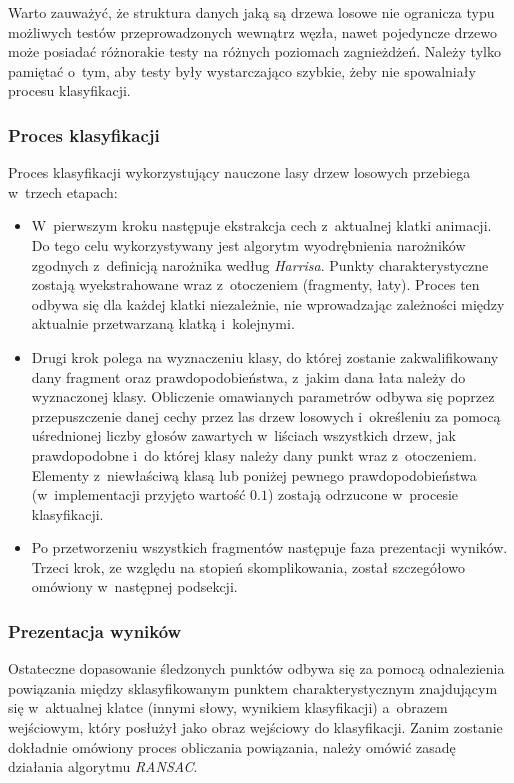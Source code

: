         Warto zauważyć, że struktura danych jaką są drzewa losowe nie ogranicza typu możliwych testów przeprowadzonych wewnątrz węzła, nawet pojedyncze drzewo może posiadać różnorakie testy na różnych poziomach zagnieżdżeń. Należy tylko pamiętać o~tym, aby testy były wystarczająco szybkie, żeby nie spowalniały procesu klasyfikacji.

      \subsubsection{Proces klasyfikacji}

        Proces klasyfikacji wykorzystujący nauczone lasy drzew losowych przebiega w~trzech etapach:
          \begin{itemize}
            \item W~pierwszym kroku następuje ekstrakcja cech z~aktualnej klatki animacji. Do tego celu wykorzystywany jest algorytm wyodrębnienia narożników zgodnych z~definicją narożnika według \textit{Harrisa}. Punkty charakterystyczne zostają wyekstrahowane wraz z~otoczeniem (fragmenty, łaty). Proces ten odbywa się dla każdej klatki niezależnie, nie wprowadzając zależności między aktualnie przetwarzaną klatką i~kolejnymi.
            \item Drugi krok polega na wyznaczeniu klasy, do której zostanie zakwalifikowany dany fragment oraz prawdopodobieństwa, z~jakim dana łata należy do wyznaczonej klasy. Obliczenie omawianych parametrów odbywa się poprzez przepuszczenie danej cechy przez las drzew losowych i~określeniu za pomocą uśrednionej liczby głosów zawartych w~liściach wszystkich drzew, jak prawdopodobne i~do której klasy należy dany punkt wraz z~otoczeniem. Elementy z~niewłaściwą klasą lub poniżej pewnego prawdopodobieństwa (w~implementacji przyjęto wartość $0.1$) zostają odrzucone w~procesie klasyfikacji.
            \item Po przetworzeniu wszystkich fragmentów następuje faza prezentacji wyników. Trzeci krok, ze względu na stopień skomplikowania, został szczegółowo omówiony w~następnej podsekcji.
          \end{itemize}

      \subsubsection{Prezentacja wyników}

        Ostateczne dopasowanie śledzonych punktów odbywa się za pomocą odnalezienia powiązania między sklasyfikowanym punktem charakterystycznym znajdującym się w~aktualnej klatce (innymi słowy, wynikiem klasyfikacji) a~obrazem wejściowym, który posłużył jako obraz wejściowy do klasyfikacji. Zanim zostanie dokładnie omówiony proces obliczania powiązania, należy omówić zasadę działania algorytmu \textit{RANSAC}.


